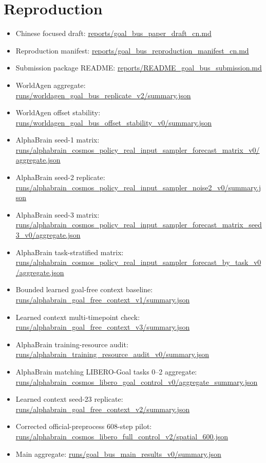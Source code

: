 \documentclass[10pt]{article}
\begin{document}
\section*{Reproduction}
\begin{itemize}[leftmargin=*]
\item Chinese focused draft: \url{reports/goal_bus_paper_draft_cn.md}
\item Reproduction manifest: \url{reports/goal_bus_reproduction_manifest_cn.md}
\item Submission package README: \url{reports/README_goal_bus_submission.md}
\item WorldAgen aggregate: \url{runs/worldagen_goal_bus_replicate_v2/summary.json}
\item WorldAgen offset stability: \url{runs/worldagen_goal_bus_offset_stability_v0/summary.json}
\item AlphaBrain seed-1 matrix: \url{runs/alphabrain_cosmos_policy_real_input_sampler_forecast_matrix_v0/aggregate.json}
\item AlphaBrain seed-2 replicate: \url{runs/alphabrain_cosmos_policy_real_input_sampler_noise2_v0/summary.json}
\item AlphaBrain seed-3 matrix: \url{runs/alphabrain_cosmos_policy_real_input_sampler_forecast_matrix_seed3_v0/aggregate.json}
\item AlphaBrain task-stratified matrix: \url{runs/alphabrain_cosmos_policy_real_input_sampler_forecast_by_task_v0/aggregate.json}
\item Bounded learned goal-free context baseline: \url{runs/alphabrain_goal_free_context_v1/summary.json}
\item Learned context multi-timepoint check: \url{runs/alphabrain_goal_free_context_v3/summary.json}
\item AlphaBrain training-resource audit: \url{runs/alphabrain_training_resource_audit_v0/summary.json}
\item AlphaBrain matching LIBERO-Goal tasks 0--2 aggregate: \url{runs/alphabrain_cosmos_libero_goal_control_v0/aggregate_summary.json}
\item Learned context seed-23 replicate: \url{runs/alphabrain_goal_free_context_v2/summary.json}
\item Corrected official-preprocess 608-step pilot: \url{runs/alphabrain_cosmos_libero_full_control_v2/spatial_600.json}
\item Main aggregate: \url{runs/goal_bus_main_results_v0/summary.json}
\end{itemize}
\end{document}
